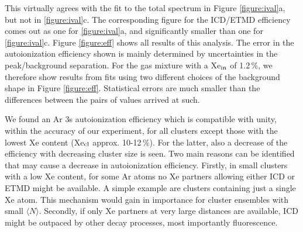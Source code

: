 \documentclass[journal=jpccck,manuscript=article]{achemso}
\begin{document}
This virtually agrees with the fit to the total spectrum in Figure \ref{figure:ival}a, but not in \ref{figure:ival}c. 
The corresponding figure for the ICD/ETMD efficiency comes out as one for \ref{figure:ival}a, and significantly smaller than one for \ref{figure:ival}c.
Figure \ref{figure:eff} shows all results of this analysis.
The error in the autoionization efficiency shown is mainly determined by uncertainties in the peak/background separation.
For the gas mixture with a Xe$_{\rm in}$ of 1.2\,\%, we therefore show results from fits using two different choices of the background shape in Figure \ref{figure:eff}.
Statistical errors are much smaller than the differences between the pairs of values arrived at such.

We found an Ar 3s autoionization efficiency which is compatible with unity, within the accuracy of our experiment, for all clusters except those with the lowest Xe content (Xe$_{\rm cl}$ approx. 10-12\,\%).
For the latter, also a decrease of the efficiency with decreasing cluster size is seen. 
Two main reasons can be identified that may cause a decrease in autoionization efficiency. 
Firstly, in small clusters with a low Xe content, for some Ar atoms no Xe partners allowing either ICD or ETMD might be available.
A simple example are clusters containing just a single Xe atom.
This mechanism would gain in importance for cluster ensembles with small $\langle N\rangle$.
Secondly, if only Xe partners at very large distances are available, ICD might be outpaced by other decay processes, most importantly fluorescence.

\end{document}
